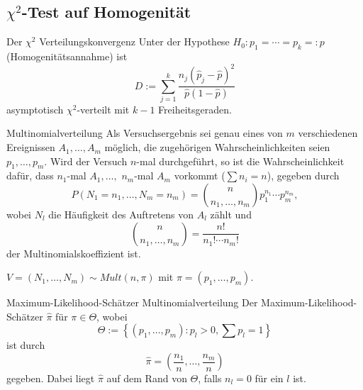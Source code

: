 \subsection{\(\chi^2\)-Test auf Homogenität}

\begin{karte}{Der \(\chi^2\) Verteilungskonvergenz}
Unter der Hypothese \(H_0: p_1 = \cdots = p_k =: p\) (Homogenitätsannahme) ist 
\[ D := \sum_{j=1}^k \frac{n_j (\hat{p}_j - \hat{p})^2}{\hat{p}(1-\hat{p})} \]
asymptotisch \(\chi^2\)-verteilt mit \(k-1\) Freiheitsgeraden.
\end{karte}

\begin{karte}{Multinomialverteilung}
Als Versuchsergebnis sei genau eines von \(m\) verschiedenen Ereignissen \(A_1, \ldots, A_m\) möglich, 
die zugehörigen Wahrscheinlichkeiten seien \(p_1, \ldots, p_m\). 
Wird der Versuch \(n\)-mal durchgeführt, so ist die Wahrscheinlichkeit dafür, dass \(n_1\)-mal \(A_1, \ldots,\) 
\(n_m\)-mal \(A_m\) vorkommt (\(\sum n_i = n\)), gegeben durch 
\[ P(N_1 = n_1, \ldots, N_m = n_m) = \binom{n}{n_1, \ldots, n_m} p_1^{n_1} \cdots p_m^{n_m}, \]
wobei \(N_l\) die Häufigkeit des Auftretens von \(A_l \) zählt und 
\[ \binom{n}{n_1, \ldots, n_m} = \frac{n!}{n_1! \cdots n_m!} \]
der Multinomialskoeffizient ist. 

\(V = (N_1, \ldots, N_m) \sim Mult(n, \pi)\) mit \(\pi = (p_1, \ldots, p_m)\).
\end{karte}

\begin{karte}{Maximum-Likelihood-Schätzer Multinomialverteilung}
Der Maximum-Likelihood-Schätzer \(\hat{\pi}\) für \(\pi \in \Theta\), wobei 
\[ \Theta := \left\{ (p_1, \ldots, p_m): p_l > 0, \sum p_l = 1 \right\} \]
ist durch 
\[ \hat{\pi} = \left( \frac{n_1}{n}, \ldots, \frac{n_m}{n} \right) \]
gegeben. Dabei liegt \(\hat{\pi}\) auf dem Rand von \(\Theta\), falls \(n_l = 0\) für ein \(l\) ist.
\end{karte}

